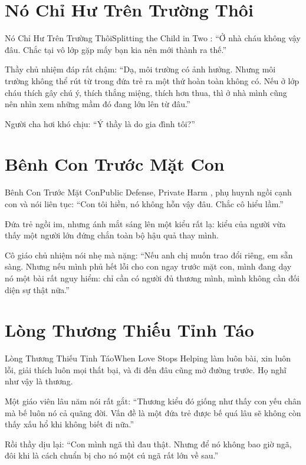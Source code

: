 \section{Nó Chỉ Hư Trên Trường Thôi}
\begin{truyen}{Nó Chỉ Hư Trên Trường Thôi}{Splitting the Child in Two}
: ``Ở nhà cháu không vậy đâu. Chắc tại vô lớp gặp mấy bạn kia nên mới thành ra thế.''

Thầy chủ nhiệm đáp rất chậm: ``Dạ, môi trường có ảnh hưởng. Nhưng môi trường không thể rút từ trong đứa trẻ ra một thứ hoàn toàn không có. Nếu ở lớp cháu thích gây chú ý, thích thắng miệng, thích hơn thua, thì ở nhà mình cũng nên nhìn xem những mầm đó đang lớn lên từ đâu.''

Người cha hơi khó chịu: ``Ý thầy là do gia đình tôi?''

\end{truyen}

\section{Bênh Con Trước Mặt Con}
\begin{truyen}{Bênh Con Trước Mặt Con}{Public Defense, Private Harm}
, phụ huynh ngồi cạnh con và nói liên tục: ``Con tôi hiền, nó không hỗn vậy đâu. Chắc cô hiểu lầm.''

Đứa trẻ ngồi im, nhưng ánh mắt sáng lên một kiểu rất lạ: kiểu của người vừa thấy một người lớn đứng chắn toàn bộ hậu quả thay mình.

Cô giáo chủ nhiệm nói nhẹ mà nặng: ``Nếu anh chị muốn trao đổi riêng, em sẵn sàng. Nhưng nếu mình phủ hết lỗi cho con ngay trước mặt con, mình đang dạy nó một bài rất nguy hiểm: chỉ cần có người đủ thương mình, mình không cần đối diện sự thật nữa.''
\end{truyen}

\section{Lòng Thương Thiếu Tỉnh Táo}
\begin{truyen}{Lòng Thương Thiếu Tỉnh Táo}{When Love Stops Helping}
 làm luôn bài, xin luôn lỗi, giải thích luôn mọi thất bại, và đi đến đâu cũng mở đường trước. Họ nghĩ như vậy là thương.

Một giáo viên lâu năm nói rất gắt: ``Thương kiểu đó giống như thấy con yếu chân mà bế luôn nó cả quãng đời. Vấn đề là một đứa trẻ được bế quá lâu sẽ không còn thấy xấu hổ khi không biết đi nữa.''

Rồi thầy dịu lại: ``Con mình ngã thì đau thật. Nhưng để nó không bao giờ ngã, đôi khi là cách chuẩn bị cho nó một cú ngã rất lớn về sau.''
\end{truyen}

